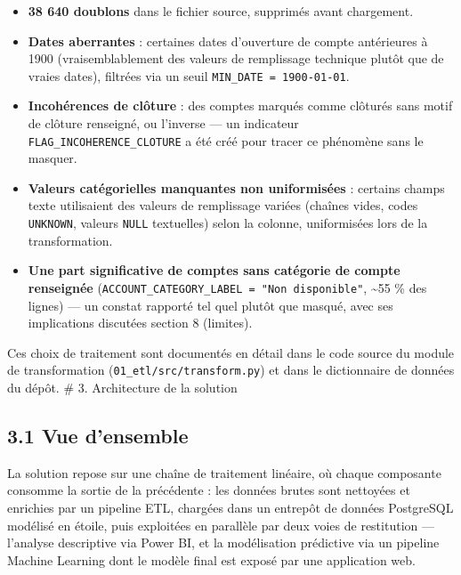 \documentclass[11pt,a4paper]{article}
\providecommand{\tightlist}{\setlength{\itemsep}{0pt}\setlength{\parskip}{0pt}}
\begin{document}
\begin{itemize}
\tightlist
\item
  \textbf{38 640 doublons} dans le fichier source, supprimés avant
  chargement.
\item
  \textbf{Dates aberrantes} : certaines dates d'ouverture de compte
  antérieures à 1900 (vraisemblablement des valeurs de remplissage
  technique plutôt que de vraies dates), filtrées via un seuil
  \texttt{MIN\_\hspace{0pt}DATE\ =\ 1900-01-01}.
\item
  \textbf{Incohérences de clôture} : des comptes marqués comme clôturés
  sans motif de clôture renseigné, ou l'inverse --- un indicateur
  \texttt{FLAG\_\hspace{0pt}INCOHERENCE\_\hspace{0pt}CLOTURE} a été créé
  pour tracer ce phénomène sans le masquer.
\item
  \textbf{Valeurs catégorielles manquantes non uniformisées} : certains
  champs texte utilisaient des valeurs de remplissage variées (chaînes
  vides, codes \texttt{UNKNOWN}, valeurs \texttt{NULL} textuelles) selon
  la colonne, uniformisées lors de la transformation.
\item
  \textbf{Une part significative de comptes sans catégorie de compte
  renseignée}
  (\texttt{ACCOUNT\_\hspace{0pt}CATEGORY\_\hspace{0pt}LABEL\ =\ "Non\ disponible"},
  \textasciitilde55 \% des lignes) --- un constat rapporté tel quel
  plutôt que masqué, avec ses implications discutées section 8
  (limites).
\end{itemize}

Ces choix de traitement sont documentés en détail dans le code source du
module de transformation
(\texttt{01\_\hspace{0pt}etl/\hspace{0pt}src/\hspace{0pt}transform.py})
et dans le dictionnaire de données du dépôt. \# 3. Architecture de la
solution

\hypertarget{vue-densemble}{%
\subsection{3.1 Vue d'ensemble}\label{vue-densemble}}

La solution repose sur une chaîne de traitement linéaire, où chaque
composante consomme la sortie de la précédente : les données brutes sont
nettoyées et enrichies par un pipeline ETL, chargées dans un entrepôt de
données PostgreSQL modélisé en étoile, puis exploitées en parallèle par
deux voies de restitution --- l'analyse descriptive via Power BI, et la
modélisation prédictive via un pipeline Machine Learning dont le modèle
final est exposé par une application web.
\end{document}
